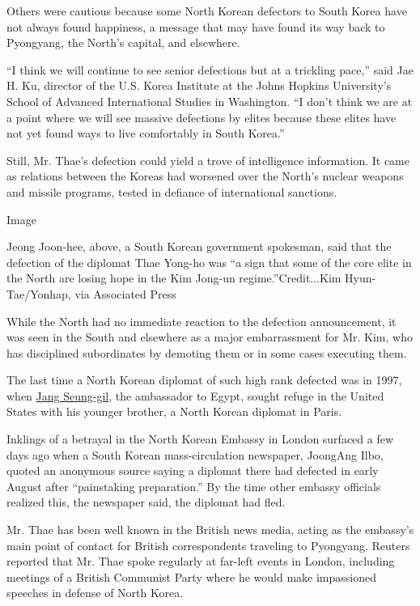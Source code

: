 Others were cautious because some North Korean defectors to South Korea
have not always found happiness, a message that may have found its way
back to Pyongyang, the North's capital, and elsewhere.

``I think we will continue to see senior defections but at a trickling
pace,'' said Jae H. Ku, director of the U.S. Korea Institute at the
Johns Hopkins University's School of Advanced International Studies in
Washington. ``I don't think we are at a point where we will see massive
defections by elites because these elites have not yet found ways to
live comfortably in South Korea.''

Still, Mr. Thae's defection could yield a trove of intelligence
information. It came as relations between the Koreas had worsened over
the North's nuclear weapons and missile programs, tested in defiance of
international sanctions.

Image

Jeong Joon-hee, above, a South Korean government spokesman, said that
the defection of the diplomat Thae Yong-ho was ``a sign that some of the
core elite in the North are losing hope in the Kim Jong-un
regime.''Credit...Kim Hyun-Tae/Yonhap, via Associated Press

While the North had no immediate reaction to the defection announcement,
it was seen in the South and elsewhere as a major embarrassment for Mr.
Kim, who has disciplined subordinates by demoting them or in some cases
executing them.

The last time a North Korean diplomat of such high rank defected was in
1997, when
\href{http://www.nytimes3xbfgragh.onion/1997/08/25/world/north-korean-envoy-said-to-defect-in-cairo.html}{Jang
Seung-gil}, the ambassador to Egypt, sought refuge in the United States
with his younger brother, a North Korean diplomat in Paris.

Inklings of a betrayal in the North Korean Embassy in London surfaced a
few days ago when a South Korean mass-circulation newspaper, JoongAng
Ilbo, quoted an anonymous source saying a diplomat there had defected in
early August after ``painstaking preparation.'' By the time other
embassy officials realized this, the newspaper said, the diplomat had
fled.

Mr. Thae has been well known in the British news media, acting as the
embassy's main point of contact for British correspondents traveling to
Pyongyang. Reuters reported that Mr. Thae spoke regularly at far-left
events in London, including meetings of a British Communist Party where
he would make impassioned speeches in defense of North Korea.

